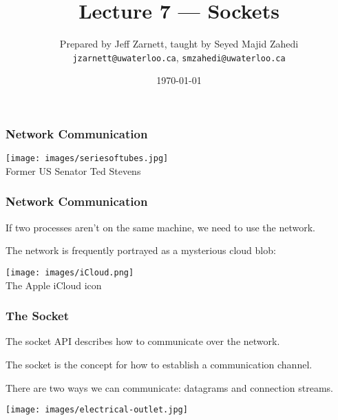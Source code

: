 

\title{Lecture 7 --- Sockets }

\author{Prepared by Jeff Zarnett, taught by Seyed Majid Zahedi \\ \small \texttt{jzarnett@uwaterloo.ca}, \texttt{smzahedi@uwaterloo.ca}}
\date{\today}




\begin{frame}
	\titlepage

\end{frame}


\begin{frame}
	\frametitle{Network Communication}

	\begin{center}
		\texttt{[image: images/seriesoftubes.jpg]}\\
		{\footnotesize Former US Senator Ted Stevens}
	\end{center}


\end{frame}


\begin{frame}
	\frametitle{Network Communication}

	If two processes aren't on the same machine, we need to use the network.

	The network is frequently portrayed as a mysterious cloud blob:

	\begin{center}
		\texttt{[image: images/iCloud.png]}\\
		{\footnotesize The Apple iCloud icon}
	\end{center}

\end{frame}


\begin{frame}
	\frametitle{The Socket}

	The \alert{socket} API describes how to communicate over the network.

	The socket is the concept for how to establish a communication channel.

	There are two ways we can communicate: datagrams and connection streams.

	\begin{center}
		\texttt{[image: images/electrical-outlet.jpg]}
	\end{center}

\end{frame}


